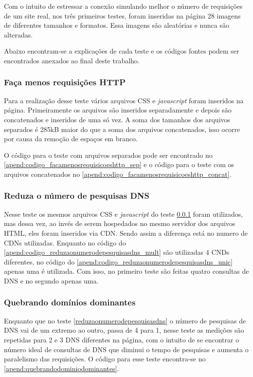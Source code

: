 Com o intuito de estressar a conexão simulando melhor o número de requisições de um site real, nos três primeiros testes, foram inseridas na página 28 imagens de diferentes tamanhos e formatos. Essa imagens são aleatórias e nunca são alteradas.

Abaixo encontram-se a explicações de cada teste e os códigos fontes podem ser encontrados anexados ao final deste trabalho.

\subsubsection{Faça menos requisições HTTP}
\label{facamenosrequisicoeshttp}

Para a realização desse teste vários arquivos CSS e \textit{javascript} foram inseridos na página. Primeiramente os arquivos são inseridos separadamente e depois são concatenados e inseridos de uma só vez. A soma dos tamanhos dos arquivos separados é 285kB maior do que a soma dos arquivos concatenados, isso ocorre por causa da remoção de espaços em branco.

O código para o teste com arquivos separados pode ser encontrado no \autoref{apend:codigo_facamenosrequisicoeshttp_sep} e o código para o teste com os arquivos concatenados no \autoref{apend:codigo_facamenosrequisicoeshttp_concat}.

\subsubsection{Reduza o número de pesquisas DNS}
\label{reduzaonumerodepesquisasdns}

Nesse teste os mesmos arquivos CSS e \textit{javascript} do teste \ref{facamenosrequisicoeshttp} foram utilizados, mas dessa vez, ao invés de serem hospedados no mesmo servidor dos arquivos HTML, eles foram inseridos via CDN. Sendo assim a diferença está no numero de CDNs utilizadas. Enquanto no código do \autoref{apend:codigo_reduzaonumerodepesquisasdns_mult} são utilizadas 4 CNDs diferentes, no código do \autoref{apend:codigo_reduzaonumerodepesquisasdns_unic} apenas uma é utilizada. Com isso, no primeiro teste são feitas quatro consultas de DNS e no segundo apenas uma.

\subsubsection{Quebrando domínios dominantes}
\label{quebrandodominiosdominantes}

Enquanto que no teste \autoref{reduzaonumerodepesquisasdns} o número de pesquisas de DNS vai de um extremo ao outro, passa de 4 para 1, nesse teste as medições são repetidas para 2 e 3 DNS diferentes na página, com o intuito de se encontrar o número ideal de consultas de DNS que diminui o tempo de pesquisas e aumenta o paralelismo das requisições. O código para esse teste encontra-se no \autoref{apend:quebrandodominiodominantes}.

